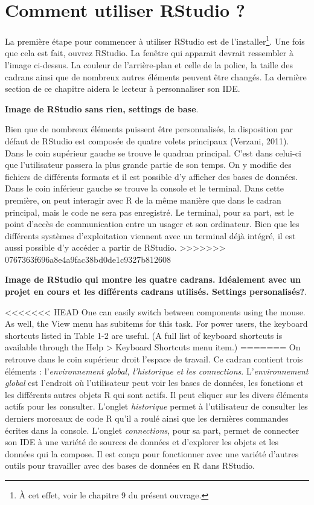\documentclass[
  letterpaper,
  DIV=11,
  numbers=noendperiod]{scrreprt}
\begin{document}
\hypertarget{comment-utiliser-rstudio}{%
\section{Comment utiliser RStudio ?}\label{comment-utiliser-rstudio}}

La première étape pour commencer à utiliser RStudio est de
l'installer\footnote{À cet effet, voir le chapitre 9 du présent ouvrage.}.
Une fois que cela est fait, ouvrez RStudio. La fenêtre qui apparait
devrait ressembler à l'image ci-dessus. La couleur de l'arrière-plan et
celle de la police, la taille des cadrans ainsi que de nombreux autres
éléments peuvent être changés. La dernière section de ce chapitre aidera
le lecteur à personnaliser son IDE.

\textbf{Image de RStudio sans rien, settings de base}.

Bien que de nombreux éléments puissent être personnalisés, la
disposition par défaut de RStudio est composée de quatre volets
principaux (Verzani, 2011). Dans le coin supérieur gauche se trouve le
quadran principal. C'est dans celui-ci que l'utilisateur passera la plus
grande partie de son temps. On y modifie des fichiers de différents
formats et il est possible d'y afficher des bases de données. Dans le
coin inférieur gauche se trouve la console et le terminal. Dans cette
première, on peut interagir avec R de la même manière que dans le cadran
principal, mais le code ne sera pas enregistré. Le terminal, pour sa
part, est le point d'accès de communication entre un usager et son
ordinateur. Bien que les différents systèmes d'exploitation viennent
avec un terminal déjà intégré, il est aussi possible d'y accéder a
partir de RStudio.
\textgreater\textgreater\textgreater\textgreater\textgreater\textgreater\textgreater{}
0767363f696a8e4a9fac38bd0de1c9327b812608

\textbf{Image de RStudio qui montre les quatre cadrans. Idéalement avec
un projet en cours et les différents cadrans utilisés. Settings
personalisés?}.

\textless\textless\textless\textless\textless\textless\textless{} HEAD
One can easily switch between components using the mouse. As well, the
View menu has subitems for this task. For power users, the keyboard
shortcuts listed in Table 1-2 are useful. (A full list of keyboard
shortcuts is available through the Help \textgreater{} Keyboard
Shortcuts menu item.) ======= On retrouve dans le coin supérieur droit
l'espace de travail. Ce cadran contient trois éléments :
l'\emph{environnement global, l'historique et les connections}.
L'\emph{environnement global} est l'endroit où l'utilisateur peut voir
les bases de données, les fonctions et les différents autres objets R
qui sont actifs. Il peut cliquer sur les divers éléments actifs pour les
consulter. L'onglet \emph{historique} permet à l'utilisateur de
consulter les derniers morceaux de code R qu'il a roulé ainsi que les
dernières commandes écrites dans la console. L'onglet
\emph{connections}, pour sa part, permet de connecter son IDE à une
variété de sources de données et d'explorer les objets et les données
qui la compose. Il est conçu pour fonctionner avec une variété d'autres
outils pour travailler avec des bases de données en R dans RStudio.
\end{document}
